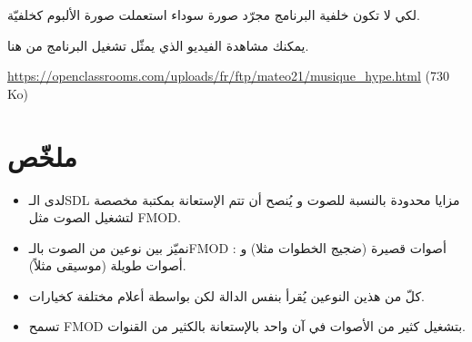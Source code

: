 لكي لا تكون خلفية البرنامج مجرّد صورة سوداء استعملت صورة الألبوم كخلفيّة.

يمكنك مشاهدة الفيديو الذي يمثّل تشغيل البرنامج من هنا.

\textenglish{\url{https://openclassrooms.com/uploads/fr/ftp/mateo21/musique_hype.html} (730 Ko)}

\section*{ملخّص}

\begin{itemize}
	\item لدى الـ\textenglish{SDL}
	مزايا محدودة بالنسبة للصوت و يُنصح أن تتم الإستعانة بمكتبة مخصصة لتشغيل الصوت مثل
	\textenglish{FMOD}.
	\item نميّز بين نوعين من الصوت بالـ\textenglish{FMOD} :
	أصوات قصيرة (ضجيج الخطوات مثلا) و أصوات طويلة (موسيقى مثلاً).
	\item كلّ من هذين النوعين يُقرأ بنفس الدالة لكن بواسطة أعلام مختلفة كخيارات.
	\item تسمح
	\textenglish{FMOD}
	بتشغيل كثير من الأصوات في آن واحد بالإستعانة بالكثير من القنوات.
\end{itemize}
